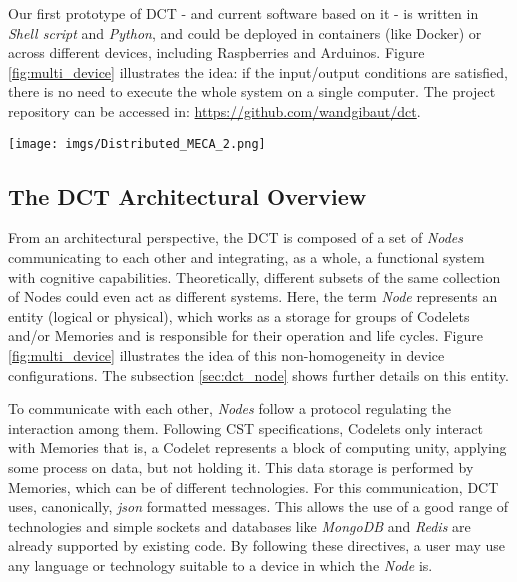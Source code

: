 Our first prototype of DCT - and current software based on it - is written in \emph{Shell script} and \emph{Python}, and could be deployed in containers (like Docker) or across different devices, including Raspberries and Arduinos. Figure \ref{fig:multi_device} illustrates the idea: if the input/output conditions are satisfied, there is no need to execute the whole system on a single computer. The project repository can be accessed in: \href{https://github.com/wandgibaut/dct}{https://github.com/wandgibaut/dct}.


\begin{figure*}[hbt]
\centering
	\texttt{[image: imgs/Distributed\_MECA\_2.png]}
\caption{Illustration of a multi-device, Codelet-oriented system as seen in \cite{gibaut2020extending}. Notice that, depending on how powerful is the device, it may run a single Codelet or multiple ones.}
\label{fig:multi_device}
\end{figure*}


\subsection{The DCT Architectural Overview}
\label{sec:dct_over}

From an architectural perspective, the DCT is composed of a set of \emph{Nodes} communicating to each other and integrating, as a whole, a functional system with cognitive capabilities. Theoretically, different subsets of the same collection of Nodes could even act as different systems. Here, the term \emph{Node} represents an entity (logical or physical), which works as a storage for groups of Codelets and/or Memories and is responsible for their operation and life cycles. Figure \ref{fig:multi_device} illustrates the idea of this non-homogeneity in device configurations. The subsection \ref{sec:dct_node} shows further details on this entity.

To communicate with each other, \emph{Nodes} follow a protocol regulating the interaction among them. Following CST specifications, Codelets only interact with Memories that is, a Codelet represents a block of computing unity, applying some process on data, but not holding it. This data storage is performed by Memories, which can be of different technologies. For this communication, DCT uses, canonically, \emph{json} formatted messages. This allows the use of a good range of technologies and simple sockets and databases like \emph{MongoDB} and \emph{Redis} are already supported by existing code. By following these directives, a user may use any language or technology suitable to a device in which the \emph{Node} is.



